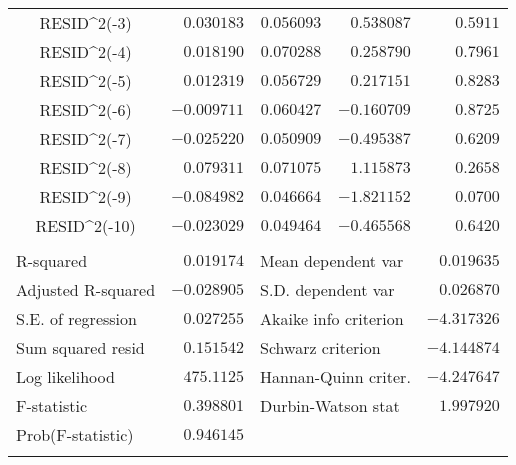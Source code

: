 \begin{tabular}{lrrrr}
\multicolumn{1}{c}{RESID\textasciicircum 2(-3)}&\multicolumn{1}{r}{$0.030183$}&\multicolumn{1}{r}{$0.056093$}&\multicolumn{1}{r}{$0.538087$}&\multicolumn{1}{r}{$0.5911$}\\
\multicolumn{1}{c}{RESID\textasciicircum 2(-4)}&\multicolumn{1}{r}{$0.018190$}&\multicolumn{1}{r}{$0.070288$}&\multicolumn{1}{r}{$0.258790$}&\multicolumn{1}{r}{$0.7961$}\\
\multicolumn{1}{c}{RESID\textasciicircum 2(-5)}&\multicolumn{1}{r}{$0.012319$}&\multicolumn{1}{r}{$0.056729$}&\multicolumn{1}{r}{$0.217151$}&\multicolumn{1}{r}{$0.8283$}\\
\multicolumn{1}{c}{RESID\textasciicircum 2(-6)}&\multicolumn{1}{r}{$-0.009711$}&\multicolumn{1}{r}{$0.060427$}&\multicolumn{1}{r}{$-0.160709$}&\multicolumn{1}{r}{$0.8725$}\\
\multicolumn{1}{c}{RESID\textasciicircum 2(-7)}&\multicolumn{1}{r}{$-0.025220$}&\multicolumn{1}{r}{$0.050909$}&\multicolumn{1}{r}{$-0.495387$}&\multicolumn{1}{r}{$0.6209$}\\
\multicolumn{1}{c}{RESID\textasciicircum 2(-8)}&\multicolumn{1}{r}{$0.079311$}&\multicolumn{1}{r}{$0.071075$}&\multicolumn{1}{r}{$1.115873$}&\multicolumn{1}{r}{$0.2658$}\\
\multicolumn{1}{c}{RESID\textasciicircum 2(-9)}&\multicolumn{1}{r}{$-0.084982$}&\multicolumn{1}{r}{$0.046664$}&\multicolumn{1}{r}{$-1.821152$}&\multicolumn{1}{r}{$0.0700$}\\
\multicolumn{1}{c}{RESID\textasciicircum 2(-10)}&\multicolumn{1}{r}{$-0.023029$}&\multicolumn{1}{r}{$0.049464$}&\multicolumn{1}{r}{$-0.465568$}&\multicolumn{1}{r}{$0.6420$}\\
[4.5pt] \hline \\ [-4.5pt]
\multicolumn{1}{l}{R-squared}&\multicolumn{1}{r}{$0.019174$}&\multicolumn{2}{l}{Mean dependent var}&\multicolumn{1}{r}{$0.019635$}\\
\multicolumn{1}{l}{Adjusted R-squared}&\multicolumn{1}{r}{$-0.028905$}&\multicolumn{2}{l}{S.D. dependent var}&\multicolumn{1}{r}{$0.026870$}\\
\multicolumn{1}{l}{S.E. of regression}&\multicolumn{1}{r}{$0.027255$}&\multicolumn{2}{l}{Akaike info criterion}&\multicolumn{1}{r}{$-4.317326$}\\
\multicolumn{1}{l}{Sum squared resid}&\multicolumn{1}{r}{$0.151542$}&\multicolumn{2}{l}{Schwarz criterion}&\multicolumn{1}{r}{$-4.144874$}\\
\multicolumn{1}{l}{Log likelihood}&\multicolumn{1}{r}{$475.1125$}&\multicolumn{2}{l}{Hannan-Quinn criter.}&\multicolumn{1}{r}{$-4.247647$}\\
\multicolumn{1}{l}{F-statistic}&\multicolumn{1}{r}{$0.398801$}&\multicolumn{2}{l}{Durbin-Watson stat}&\multicolumn{1}{r}{$1.997920$}\\
\multicolumn{1}{l}{Prob(F-statistic)}&\multicolumn{1}{r}{$0.946145$}&\multicolumn{1}{c}{}&\multicolumn{1}{c}{}&\multicolumn{1}{c}{}\\
[4.5pt] \hline \\ [-4.5pt]
\end{tabular}